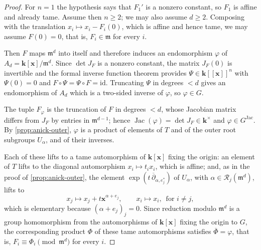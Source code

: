 \documentclass[11pt,letterpaper,reqno]{amsart}
\theoremstyle{remark}
\theoremstyle{definition}
\def\M{\mathfrak{m}}
\def\XX{\mathbf{x}}
\newcommand{\KK}[0]{\ensuremath{\mathbf{k}}}
\newcommand{\R}{\mathcal R}
\newcommand{\jac}[0]{\ensuremath{\operatorname{Jac}}}
\begin{document}
\begin{proof}
For $n=1$ the hypothesis says that $F_1'$ is a nonzero constant, so $F_1$ is affine and
already tame. Assume then $n\geq2$; we may also assume $d\geq2$. Composing with the
translation $x_i\mapsto x_i-F_i(0)$, which is affine and hence tame, we may assume
$F(0)=0$, that is, $F_i\in\M$ for every $i$.

Then $F$ maps $\M^d$ into itself and therefore induces an endomorphism $\varphi$ of
$A_d=\KK[\XX]/\M^d$. Since $\det J_F$ is a nonzero constant, the matrix $J_F(0)$ is
invertible and the formal inverse function theorem \cite[Theorem 1.1.2]{vdE00} provides
$\Psi\in\KK[[\XX]]^n$ with $\Psi(0)=0$ and $F\circ\Psi=\Psi\circ F=\mathrm{id}$. Truncating
$\Psi$ in degrees $<d$ gives an endomorphism of $A_d$ which is a two-sided inverse of
$\varphi$, so $\varphi\in G$.

The tuple $F_\varphi$ is the truncation of $F$ in degrees $<d$, whose Jacobian matrix
differs from $J_F$ by entries in $\M^{d-1}$; hence
$\jac(\varphi)=\det J_F\in\KK^\times$ and $\varphi\in G^{\jac}$. By
\cref{prop:anick-outer}, $\varphi$ is a product of elements of $T$ and of the outer root
subgroups $U_\alpha$, and of their inverses.

Each of these lifts to a tame automorphism of $\KK[\XX]$ fixing the origin: an element of $T$ lifts to the diagonal automorphism $x_i\mapsto t_ix_i$, which is affine; and, as in the proof of \cref{prop:anick-outer}, the element $\exp(t\,\overline\partial_{\alpha,e_j^*})$ of $U_\alpha$, with $\alpha\in\R_j(\M^d)$, lifts to
\[x_j\mapsto x_j+t\XX^{\alpha+e_j},\qquad x_i\mapsto x_i,\,\text{ for } i\neq j,\]
which is elementary because $(\alpha+e_j)_j=0$. Since reduction modulo $\M^d$ is a group homomorphism from the automorphisms of $\KK[\XX]$ fixing the origin to $G$, the corresponding product $\Phi$ of these tame automorphisms satisfies $\overline\Phi=\varphi$, that is, $F_i\equiv\Phi_i\pmod{\M^d}$ for every $i$.

\end{proof}




\end{document}
